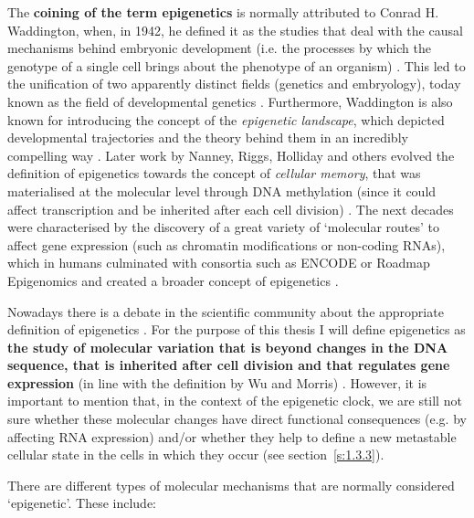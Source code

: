 \smallskip

The \textbf{coining of the term epigenetics} is normally attributed to Conrad H. Waddington, when, in 1942, he defined it as the studies that deal with the causal mechanisms behind embryonic development (i.e. the processes by which the genotype of a single cell brings about the phenotype of an organism) \citep{Waddington1942}. This led to the unification of two apparently distinct fields (genetics and embryology), today known as the field of developmental genetics \citep{Gilbert2011}. Furthermore, Waddington is also known for introducing the concept of the \textit{epigenetic landscape}, which depicted developmental trajectories and the theory behind them in an incredibly compelling way \citep{Waddington1957}. Later work by Nanney, Riggs, Holliday and others evolved the definition of epigenetics towards the concept of \textit{cellular memory}, that was materialised at the molecular level through DNA methylation (since it could affect transcription and be inherited after each cell division) \citep{Lappalainen2017}. The next decades were characterised by the discovery of a great variety of `molecular routes' to affect gene expression (such as chromatin modifications or non-coding RNAs), which in humans culminated with consortia such as ENCODE \citep{Consortium2012} or Roadmap Epigenomics \citep{Consortium2015} and created a broader concept of epigenetics \citep{Lappalainen2017,Greally2018}.

\bigskip

Nowadays there is a debate in the scientific community about the appropriate definition of epigenetics \citep{Greally2018,Bird2007}. For the purpose of this thesis I will define epigenetics as \textbf{the study of molecular variation that is beyond changes in the DNA sequence, that is inherited after cell division and that regulates gene expression} (in line with the definition by Wu and Morris) \citep{Wu2001}. However, it is important to mention that, in the context of the epigenetic clock, we are still not sure whether these molecular changes have direct functional consequences (e.g. by affecting RNA expression) and/or whether they help to define a new metastable cellular state in the cells in which they occur (see section~\ref{s:1.3.3}).

\bigskip

There are different types of molecular mechanisms that are normally considered `epigenetic'. These include:

